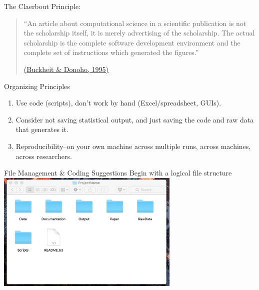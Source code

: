 \documentclass{beamer}
\begin{document}
\begin{frame}
The Claerbout Principle:

\begin{quote}``An article about computational science in a scientific publication is not the scholarship itself, it is merely advertising of the scholarship. The actual scholarship is the complete software development environment and the complete set of instructions which generated the figures.'' 

\href{https://statweb.stanford.edu/~wavelab/Wavelab_850/wavelab.pdf}{(Buckheit \& Donoho, 1995)}\end{quote}
\end{frame}

\begin{frame}{Organizing Principles}
\begin{enumerate}
	\item Use code (scripts), don't work by hand (Excel/spreadsheet, GUIs).
	\item Consider not saving statistical output, and just saving the code and raw data that generates it.
	\item Reproducibility--on your own machine across multiple runs, across machines, across researchers. 
\end{enumerate}
\end{frame}

\begin{frame}{File Management \& Coding Suggestions}
Begin with a logical file structure 
\includegraphics[height=2.25in]{../Images/files.png}
\end{frame}
\end{document}
